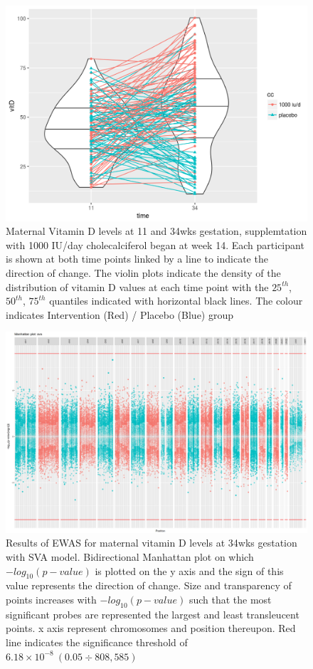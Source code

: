 \documentclass[
]{book}
\begin{document}
\begin{figure}

{\centering \includegraphics[width=0.8\linewidth]{figs/MAVIDOSvitDviolinMonApr162018} 

}

\caption{Maternal Vitamin D levels at 11 and 34wks gestation, supplemtation with 1000 IU/day cholecalciferol began at week 14. Each participant is shown at both time points linked by a line to indicate the direction of change. The violin plots indicate the density of the distribution of vitamin D values at each time point with the \(25^{th}\), \(50^{th}\), \(75^{th}\) quantiles indicated with horizontal black lines. The colour indicates Intervention (Red) / Placebo (Blue) group}\label{fig:MAVIDOSvitDviolinMonApr162018}
\end{figure}



\begin{figure}

{\centering \includegraphics[width=0.8\linewidth]{figs/MAVIDOSmVitD34EPICewasManhattanSVA} 

}

\caption{Results of EWAS for maternal vitamin D levels at 34wks gestation with SVA model. Bidirectional Manhattan plot on which \(-log_{10}(p-value)\) is plotted on the y axis and the sign of this value represents the direction of change. Size and transparency of points increases with \(-log_{10}(p-value)\) such that the most significant probes are represented the largest and least transleucent points. x axis represent chromosomes and position thereupon. Red line indicates the significance threshold of \(6.18\times10^{-8}~(0.05\div808,585)\)}\label{fig:MAVIDOSmVitD34EPICewasManhattanSVA}
\end{figure}
\end{document}
